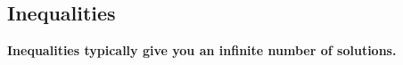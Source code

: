 \documentclass{article}
\begin{document}
\newpage 







\newpage 

\subsection*{Inequalities}

{\color{blue}\textbf{Inequalities typically give you an infinite number of solutions.}}	\newline
\end{document}
